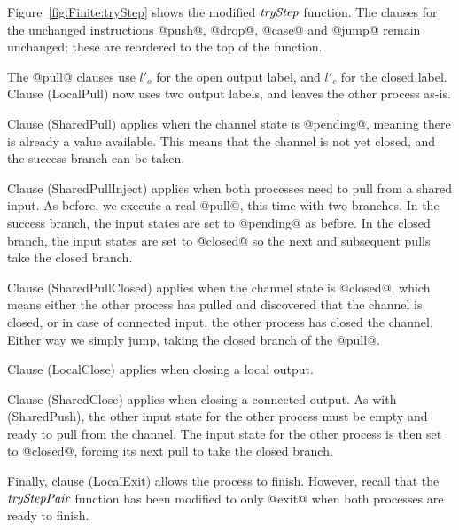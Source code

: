 Figure~\ref{fig:Finite:tryStep} shows the modified $\textit{tryStep}$ function.
The clauses for the unchanged instructions @push@, @drop@, @case@ and @jump@ remain unchanged; these are reordered to the top of the function.

The @pull@ clauses use $l'_o$ for the open output label, and $l'_c$ for the closed label.
Clause (LocalPull) now uses two output labels, and leaves the other process as-is.

Clause (SharedPull) applies when the channel state is @pending@, meaning there is already a value available. This means that the channel is not yet closed, and the success branch can be taken.

Clause (SharedPullInject) applies when both processes need to pull from a shared input. As before, we execute a real @pull@, this time with two branches. In the success branch, the input states are set to @pending@ as before. In the closed branch, the input states are set to @closed@ so the next and subsequent pulls take the closed branch.

Clause (SharedPullClosed) applies when the channel state is @closed@, which means either the other process has pulled and discovered that the channel is closed, or in case of connected input, the other process has closed the channel. Either way we simply jump, taking the closed branch of the @pull@.

Clause (LocalClose) applies when closing a local output.

Clause (SharedClose) applies when closing a connected output. As with (SharedPush), the other input state for the other process must be empty and ready to pull from the channel. The input state for the other process is then set to @closed@, forcing its next pull to take the closed branch.

Finally, clause (LocalExit) allows the process to finish. However, recall that the $\textit{tryStepPair}$ function has been modified to only @exit@ when both processes are ready to finish.

